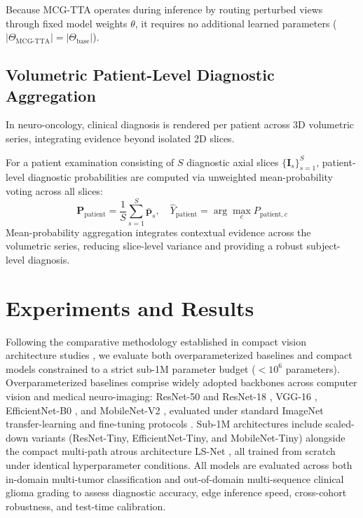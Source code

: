 \documentclass[journal]{IEEEtran}
\begin{document}
Because MCG-TTA operates during inference by routing perturbed views through fixed model weights $\theta$, it requires no additional learned parameters ($|\Theta_{\text{MCG-TTA}}| = |\Theta_{\text{base}}|$).

\subsection{Volumetric Patient-Level Diagnostic Aggregation}

In neuro-oncology, clinical diagnosis is rendered per patient across 3D volumetric series, integrating evidence beyond isolated 2D slices.

For a patient examination consisting of $S$ diagnostic axial slices $\{\mathbf{I}_s\}_{s=1}^S$, patient-level diagnostic probabilities are computed via unweighted mean-probability voting across all slices:
\begin{equation}
\mathbf{P}_{\text{patient}} = \frac{1}{S} \sum_{s=1}^S \bar{\mathbf{p}}_s, \quad \hat{Y}_{\text{patient}} = \arg\max_{c} P_{\text{patient}, c}
\label{eq:patient_aggregation}
\end{equation}
Mean-probability aggregation integrates contextual evidence across the volumetric series, reducing slice-level variance and providing a robust subject-level diagnosis.




\section{Experiments and Results}
\label{sec:experiments}

Following the comparative methodology established in compact vision architecture studies \cite{16}, we evaluate both overparameterized baselines and compact models constrained to a strict sub-1M parameter budget ($<10^6$ parameters). Overparameterized baselines comprise widely adopted backbones across computer vision and medical neuro-imaging: ResNet-50 and ResNet-18 \cite{10}, VGG-16 \cite{29}, EfficientNet-B0 \cite{30}, and MobileNet-V2 \cite{27}, evaluated under standard ImageNet transfer-learning and fine-tuning protocols \cite{7, 38, 39}. Sub-1M architectures include scaled-down variants (ResNet-Tiny, EfficientNet-Tiny, and MobileNet-Tiny) alongside the compact multi-path atrous architecture LS-Net \cite{16}, all trained from scratch under identical hyperparameter conditions. All models are evaluated across both in-domain multi-tumor classification and out-of-domain multi-sequence clinical glioma grading to assess diagnostic accuracy, edge inference speed, cross-cohort robustness, and test-time calibration.
\end{document}
